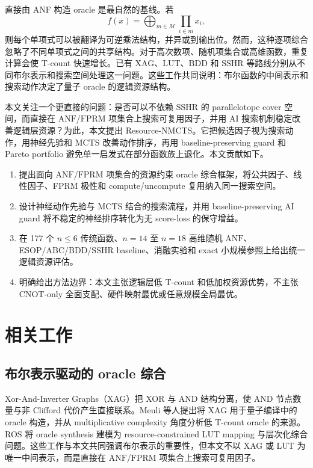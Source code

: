 \documentclass[UTF8,fontset=macnew,11pt]{ctexart}
\newcommand{\method}{Resource-NMCTS}
\newcommand{\anf}{\ensuremath{\mathrm{ANF}}}
\newcommand{\fprm}{\ensuremath{\mathrm{FPRM}}}
\newcommand{\mcts}{\ensuremath{\mathrm{MCTS}}}
\begin{document}
直接由 ANF 构造 oracle 是最自然的基线。若
\begin{equation}
  f(x)=\bigoplus_{m\in\mathcal{M}}\prod_{i\in m}x_i ,
  \label{eq:anf}
\end{equation}
则每个单项式可以被翻译为可逆乘法结构，并异或到输出位。然而，这种逐项综合忽略了不同单项式之间的共享结构。对于高次数项、随机项集合或高维函数，重复计算会使 T-count 快速增长。已有 XAG、LUT、BDD 和 SSHR 等路线分别从不同布尔表示和搜索空间处理这一问题\cite{meuli2022xag,meuli2020ros,wille2009bdd,zheng2025sshr}。这些工作共同说明：布尔函数的中间表示和搜索动作决定了量子 oracle 的逻辑资源结构。

本文关注一个更直接的问题：是否可以不依赖 SSHR 的 parallelotope cover 空间，而直接在 \anf{}/\fprm{} 项集合上搜索可复用因子，并用 AI 搜索机制稳定改善逻辑层资源？为此，本文提出 \method{}。它把候选因子视为搜索动作，用神经先验和 \mcts{} 改善动作排序，再用 baseline-preserving guard 和 Pareto portfolio 避免单一启发式在部分函数族上退化。本文贡献如下。

\begin{enumerate}
  \item 提出面向 \anf{}/\fprm{} 项集合的资源约束 oracle 综合框架，将公共因子、线性因子、FPRM 极性和 compute/uncompute 复用纳入同一搜索空间。
  \item 设计神经动作先验与 \mcts{} 结合的搜索流程，并用 baseline-preserving AI guard 将不稳定的神经排序转化为无 score-loss 的保守增益。
  \item 在 177 个 $n\leq6$ 传统函数、$n=14$ 至 $n=18$ 高维随机 \anf{}、ESOP/ABC/BDD/SSHR baseline、消融实验和 exact 小规模参照上给出统一逻辑资源评估。
  \item 明确给出方法边界：本文主张逻辑层低 T-count 和低加权资源优势，不主张 CNOT-only 全面支配、硬件映射最优或任意规模全局最优。
\end{enumerate}

\section{相关工作}

\subsection{布尔表示驱动的 oracle 综合}

Xor-And-Inverter Graphs（XAG）把 XOR 与 AND 结构分离，使 AND 节点数量与非 Clifford 代价产生直接联系。Meuli 等人提出将 XAG 用于量子编译中的 oracle 构造\cite{meuli2022xag}，并从 multiplicative complexity 角度分析低 T-count oracle 的来源\cite{meuli2019multiplicative}。ROS 将 oracle synthesis 建模为 resource-constrained LUT mapping 与层次化综合问题\cite{meuli2020ros}。这些工作与本文共同强调布尔表示的重要性，但本文不以 XAG 或 LUT 为唯一中间表示，而是直接在 \anf{}/\fprm{} 项集合上搜索可复用因子。
\end{document}

